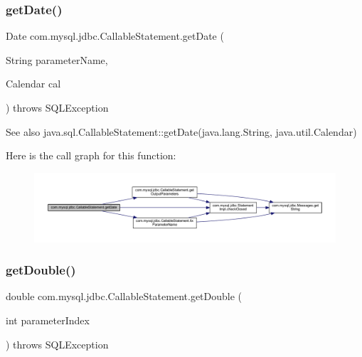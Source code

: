 \subsubsection{\texorpdfstring{get\+Date()}{getDate()}\hspace{0.1cm}{\footnotesize\ttfamily [4/4]}}
{\footnotesize\ttfamily Date com.\+mysql.\+jdbc.\+Callable\+Statement.\+get\+Date (\begin{DoxyParamCaption}\item[{String}]{parameter\+Name,  }\item[{Calendar}]{cal }\end{DoxyParamCaption}) throws S\+Q\+L\+Exception}

\begin{DoxySeeAlso}{See also}
java.\+sql.\+Callable\+Statement\+::get\+Date(java.\+lang.\+String, java.\+util.\+Calendar) 
\end{DoxySeeAlso}
Here is the call graph for this function\+:\nopagebreak
\begin{figure}[H]
\begin{center}
\leavevmode
\includegraphics[width=350pt]{classcom_1_1mysql_1_1jdbc_1_1_callable_statement_a505f0e9a0a426dd9c71cd0e4a43bd13e_cgraph}
\end{center}
\end{figure}
\mbox{\label{classcom_1_1mysql_1_1jdbc_1_1_callable_statement_a08f25a1b0d48b0085e418aaf5445ce19}} 
\subsubsection{\texorpdfstring{get\+Double()}{getDouble()}\hspace{0.1cm}{\footnotesize\ttfamily [1/2]}}
{\footnotesize\ttfamily double com.\+mysql.\+jdbc.\+Callable\+Statement.\+get\+Double (\begin{DoxyParamCaption}\item[{int}]{parameter\+Index }\end{DoxyParamCaption}) throws S\+Q\+L\+Exception}

